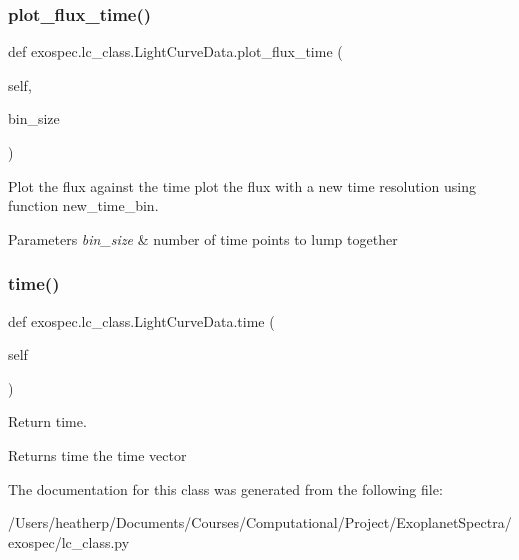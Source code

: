 \subsubsection{\texorpdfstring{plot\+\_\+flux\+\_\+time()}{plot\_flux\_time()}}
{\footnotesize\ttfamily def exospec.\+lc\+\_\+class.\+Light\+Curve\+Data.\+plot\+\_\+flux\+\_\+time (\begin{DoxyParamCaption}\item[{}]{self,  }\item[{}]{bin\+\_\+size }\end{DoxyParamCaption})}



Plot the flux against the time plot the flux with a new time resolution using function new\+\_\+time\+\_\+bin. 


\begin{DoxyParams}{Parameters}
{\em bin\+\_\+size} & number of time points to lump together \\
\hline
\end{DoxyParams}
\mbox{\label{classexospec_1_1lc__class_1_1_light_curve_data_ad216feba69b805a0732a43555354c76d}} 
\subsubsection{\texorpdfstring{time()}{time()}}
{\footnotesize\ttfamily def exospec.\+lc\+\_\+class.\+Light\+Curve\+Data.\+time (\begin{DoxyParamCaption}\item[{}]{self }\end{DoxyParamCaption})}



Return time. 

\begin{DoxyReturn}{Returns}
time the time vector 
\end{DoxyReturn}


The documentation for this class was generated from the following file\+:\begin{DoxyCompactItemize}
\item 
/\+Users/heatherp/\+Documents/\+Courses/\+Computational/\+Project/\+Exoplanet\+Spectra/exospec/lc\+\_\+class.\+py\end{DoxyCompactItemize}
